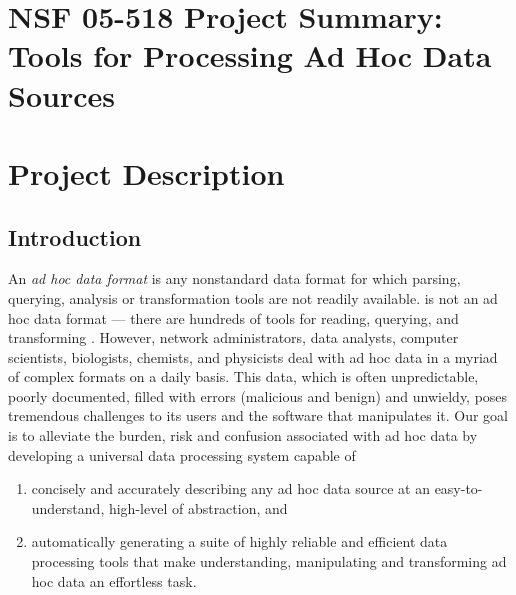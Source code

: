 \documentclass[11pt]{article}
\begin{document}
\setcounter{page}{1}
\appendix
\section{NSF 05-518 Project Summary:  Tools for Processing Ad Hoc Data Sources}

\newpage
\setcounter{page}{1}
\section{Project Description}

\subsection{Introduction}
\label{ssec:intro}

An {\em ad hoc data format} is any nonstandard data format for which
parsing, querying, analysis or transformation tools are not readily
available.  \xml{} is not an ad hoc data format --- there are hundreds
of tools for reading, querying, and transforming \xml{}.  However,
network administrators,
data analysts, computer scientists,
biologists, chemists, and physicists deal with ad hoc
data in a myriad of complex formats on a daily basis.
This data, which is often unpredictable, poorly documented,
filled with errors (malicious and benign) and unwieldy,
poses tremendous challenges to its users and the software
that manipulates it.  
Our goal is to alleviate the burden, risk and confusion associated
with ad hoc data by developing a universal data processing system
capable of 

\begin{enumerate}
\item concisely and accurately describing any ad hoc data source at an 
easy-to-understand, high-level of abstraction, and
\item automatically generating a suite of highly reliable and
efficient data processing tools that make understanding, manipulating 
and transforming ad hoc data an effortless task.
\end{enumerate}
\end{document}

